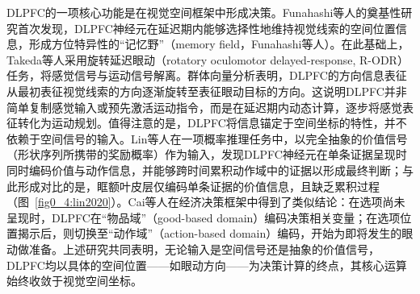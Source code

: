 DLPFC的一项核心功能是在视觉空间框架中形成决策。Funahashi等人的奠基性研究首次发现，DLPFC神经元在延迟期内能够选择性地维持视觉线索的空间位置信息，形成方位特异性的“记忆野”（memory field，Funahashi等人\cite{funahashi1989mnemonic}）。在此基础上，Takeda等人采用旋转延迟眼动（rotatory oculomotor delayed-response, R-ODR）任务，将感觉信号与运动信号解离。群体向量分析表明，DLPFC的方向信息表征从最初表征视觉线索的方向逐渐旋转至表征眼动目标的方向\cite{takeda2004population}。这说明DLPFC并非简单复制感觉输入或预先激活运动指令，而是在延迟期内动态计算，逐步将感觉表征转化为运动规划。值得注意的是，DLPFC将信息锚定于空间坐标的特性，并不依赖于空间信号的输入。Lin等人在一项概率推理任务中，以完全抽象的价值信号（形状序列所携带的奖励概率）作为输入，发现DLPFC神经元在单条证据呈现时同时编码价值与动作信息，并能够跨时间累积动作域中的证据以形成最终判断；与此形成对比的是，眶额叶皮层仅编码单条证据的价值信息，且缺乏累积过程（图~\ref{fig0_4:lin2020}）\cite{lin2020evidence}。Cai等人在经济决策框架中得到了类似结论：在选项尚未呈现时，DLPFC在“物品域”（good-based domain）编码决策相关变量；在选项位置揭示后，则切换至“动作域”（action-based domain）编码，开始为即将发生的眼动做准备\cite{cai2014contributions}。上述研究共同表明，无论输入是空间信号还是抽象的价值信号，DLPFC均以具体的空间位置——如眼动方向——为决策计算的终点，其核心运算始终收敛于视觉空间坐标。

